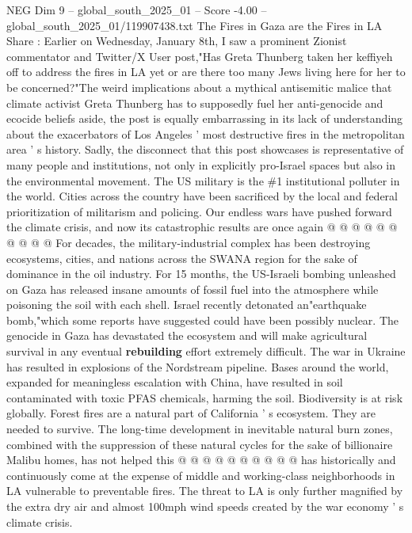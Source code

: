 \begin{textsample}{NEG Dim 9 – global\_south\_2025\_01 – Score -4.00 – global\_south\_2025\_01/119907438.txt}  \label{ex:f9_neg_109}
The Fires in Gaza are the Fires in LA Share : Earlier on Wednesday, January 8th, I saw a prominent Zionist commentator and Twitter/X User post,"Has Greta Thunberg taken her keffiyeh off to address the fires in LA yet or are there too many Jews living here for her to be concerned?"The weird implications about a mythical antisemitic malice that climate activist Greta Thunberg has to supposedly fuel her anti-genocide and ecocide beliefs aside, the post is equally embarrassing in its lack of understanding about the exacerbators of Los Angeles ' most destructive fires in the metropolitan area ' s history.
Sadly, the disconnect that this post showcases is representative of many people and institutions, not only in explicitly pro-Israel spaces but also in the environmental movement.
The US military is the \#1 institutional polluter in the world.
Cities across the country have been sacrificed by the local and federal prioritization of militarism and policing.
Our endless wars have pushed forward the climate crisis, and now its catastrophic results are once again @ @ @ @ @ @ @ @ @ @ For decades, the military-industrial complex has been destroying ecosystems, cities, and nations across the SWANA region for the sake of dominance in the oil industry.
For 15 months, the US-Israeli bombing unleashed on Gaza has released insane amounts of fossil fuel into the atmosphere while poisoning the soil with each shell.
Israel recently detonated an"earthquake bomb,"which some reports have suggested could have been possibly nuclear.
The genocide in Gaza has devastated the ecosystem and will make agricultural survival in any eventual \textbf{rebuilding} effort extremely difficult.
The war in Ukraine has resulted in explosions of the Nordstream pipeline.
Bases around the world, expanded for meaningless escalation with China, have resulted in soil contaminated with toxic PFAS chemicals, harming the soil.
Biodiversity is at risk globally.
Forest fires are a natural part of California ' s ecosystem.
They are needed to survive.
The long-time development in inevitable natural burn zones, combined with the suppression of these natural cycles for the sake of billionaire Malibu homes, has not helped this @ @ @ @ @ @ @ @ @ @ has historically and continuously come at the expense of middle and working-class neighborhoods in LA vulnerable to preventable fires.
The threat to LA is only further magnified by the extra dry air and almost 100mph wind speeds created by the war economy ' s climate crisis.

\end{textsample}
